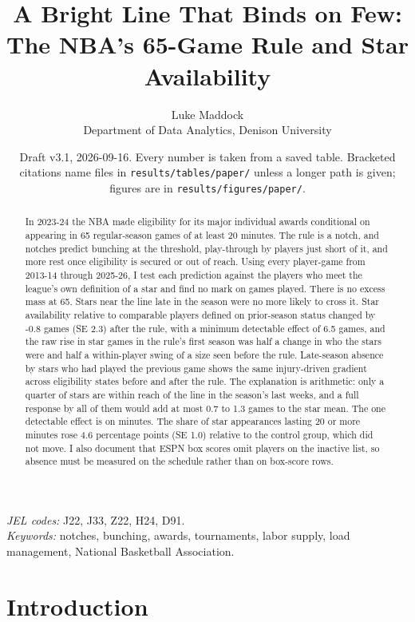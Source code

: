 \documentclass[11pt]{article}
\title{A Bright Line That Binds on Few: The NBA's 65-Game Rule and Star Availability}
\author{Luke Maddock\\ \small Department of Data Analytics, Denison University}
\date{Draft v3.1, 2026-09-16. Every number is taken from a saved table. Bracketed citations name files in \texttt{results/tables/paper/} unless a longer path is given; figures are in \texttt{results/figures/paper/}.}
\begin{document}
\maketitle



\begin{abstract}
In 2023-24 the NBA made eligibility for its major individual awards conditional on appearing in 65 regular-season games of at least 20 minutes. The rule is a notch, and notches predict bunching at the threshold, play-through by players just short of it, and more rest once eligibility is secured or out of reach. Using every player-game from 2013-14 through 2025-26, I test each prediction against the players who meet the league's own definition of a star and find no mark on games played. There is no excess mass at 65. Stars near the line late in the season were no more likely to cross it. Star availability relative to comparable players defined on prior-season status changed by -0.8 games (SE 2.3) after the rule, with a minimum detectable effect of 6.5 games, and the raw rise in star games in the rule's first season was half a change in who the stars were and half a within-player swing of a size seen before the rule. Late-season absence by stars who had played the previous game shows the same injury-driven gradient across eligibility states before and after the rule. The explanation is arithmetic: only a quarter of stars are within reach of the line in the season's last weeks, and a full response by all of them would add at most 0.7 to 1.3 games to the star mean. The one detectable effect is on minutes. The share of star appearances lasting 20 or more minutes rose 4.6 percentage points (SE 1.0) relative to the control group, which did not move. I also document that ESPN box scores omit players on the inactive list, so absence must be measured on the schedule rather than on box-score rows.
\end{abstract}

\noindent \emph{JEL codes:} J22, J33, Z22, H24, D91.\\ \emph{Keywords:} notches, bunching, awards, tournaments, labor supply, load management, National Basketball Association.

\clearpage


\section{Introduction}
\end{document}
